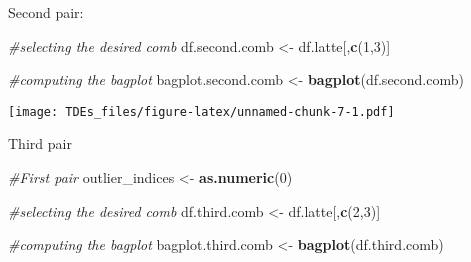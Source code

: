 \documentclass[
]{article}
\newenvironment{Shaded}{\begin{snugshade}}{\end{snugshade}}
\newcommand{\CommentTok}[1]{\textcolor[rgb]{0.56,0.35,0.01}{\textit{#1}}}
\newcommand{\ControlFlowTok}[1]{\textcolor[rgb]{0.13,0.29,0.53}{\textbf{#1}}}
\newcommand{\DecValTok}[1]{\textcolor[rgb]{0.00,0.00,0.81}{#1}}
\newcommand{\FunctionTok}[1]{\textcolor[rgb]{0.13,0.29,0.53}{\textbf{#1}}}
\newcommand{\NormalTok}[1]{#1}
\newcommand{\OtherTok}[1]{\textcolor[rgb]{0.56,0.35,0.01}{#1}}
\newcommand{\SpecialCharTok}[1]{\textcolor[rgb]{0.81,0.36,0.00}{\textbf{#1}}}
\begin{document}
Second pair:

\begin{Shaded}
\begin{Highlighting}[]
\CommentTok{\#selecting the desired comb}
\NormalTok{df.second.comb }\OtherTok{\textless{}{-}}\NormalTok{ df.latte[,}\FunctionTok{c}\NormalTok{(}\DecValTok{1}\NormalTok{,}\DecValTok{3}\NormalTok{)]}

\CommentTok{\#computing the bagplot}
\NormalTok{bagplot.second.comb }\OtherTok{\textless{}{-}} \FunctionTok{bagplot}\NormalTok{(df.second.comb)}
\end{Highlighting}
\end{Shaded}

\texttt{[image: TDEs\_files/figure-latex/unnamed-chunk-7-1.pdf]}

\begin{Shaded}
\end{Shaded}

Third pair

\begin{Shaded}
\begin{Highlighting}[]
\CommentTok{\#First pair}
\NormalTok{outlier\_indices }\OtherTok{\textless{}{-}} \FunctionTok{as.numeric}\NormalTok{(}\DecValTok{0}\NormalTok{)}

\CommentTok{\#selecting the desired comb}
\NormalTok{df.third.comb }\OtherTok{\textless{}{-}}\NormalTok{ df.latte[,}\FunctionTok{c}\NormalTok{(}\DecValTok{2}\NormalTok{,}\DecValTok{3}\NormalTok{)]}

\CommentTok{\#computing the bagplot}
\NormalTok{bagplot.third.comb }\OtherTok{\textless{}{-}} \FunctionTok{bagplot}\NormalTok{(df.third.comb)}
\end{Highlighting}
\end{Shaded}
\end{document}

